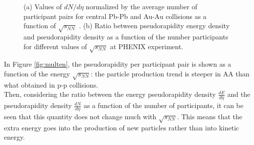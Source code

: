 \begin{figure}
  \caption{(a) Values of $dN/d\eta$ normalized by the average number of participant pairs for central Pb-Pb and Au-Au collisions as a function of $\sqrt{s_{NN}}$ \cite{multen}. (b) Ratio between pseudorapidity energy density and pseudorapidity density as a function of the number participants for different values of $\sqrt{s_{NN}}$ at PHENIX experiment.}
\end{figure}
%
In Figure \ref{fig:multen}, the pseudorapidity per participant pair is shown as a function of the energy $\sqrt{s_{NN}}$: the particle production trend is steeper in AA than what obtained in p-p collisions.\\
Then, considering the ratio between the energy pseudorapidity density $\frac{dE}{d\eta}$ and  the pseudorapidity density $\frac{dN}{d\eta}$ as a function of the number of participants, it can be seen that this quantity does not change much with $\sqrt{s_{NN}}$. This means that the extra energy goes into the production of new particles rather than into kinetic energy.\\
%
